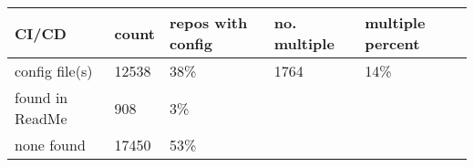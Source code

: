 
    \begin{table}[h]
\begin{tabular}{|l|l|l|l|l|}
\hline
    CI/CD & \textbf{count} & \textbf{repos with config} & \textbf{no. multiple} & \textbf{multiple percent}   \\ \hline
config file(s) &           12538     & 38\%                                & 1764          & 14\%             \\ \hline
found in ReadMe & 908     & 3\%                                &             &             \\ \hline
none found &            17450     & 53\%                                &             &             \\ \hline
\end{tabular}
\end{table}
    